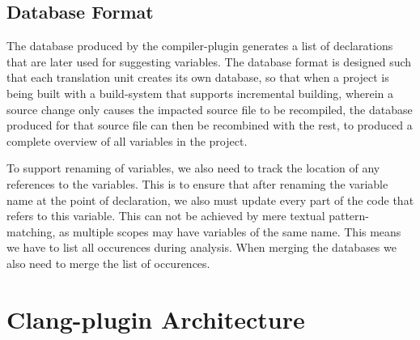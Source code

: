 \subsection{Database Format}
The database produced by the compiler-plugin generates a list of declarations
that are later used for suggesting variables.
The database format is designed such that each translation unit creates its own
database, so that when a project is being built with a build-system that
supports incremental building, wherein a source change only causes the impacted
source file to be recompiled, the database produced for that source file can
then be recombined with the rest, to produced a complete overview of all
variables in the project.

To support renaming of variables, we also need to track the location of any
references to the variables. This is to ensure that after renaming the
variable name at the point of declaration, we also must update every part of the
code that refers to this variable. This can not be achieved by mere textual
pattern-matching, as multiple scopes may have variables of the same name. This
means we have to list all occurences during analysis. When merging the databases
we also need to merge the list of occurences.

\section{Clang-plugin Architecture}

